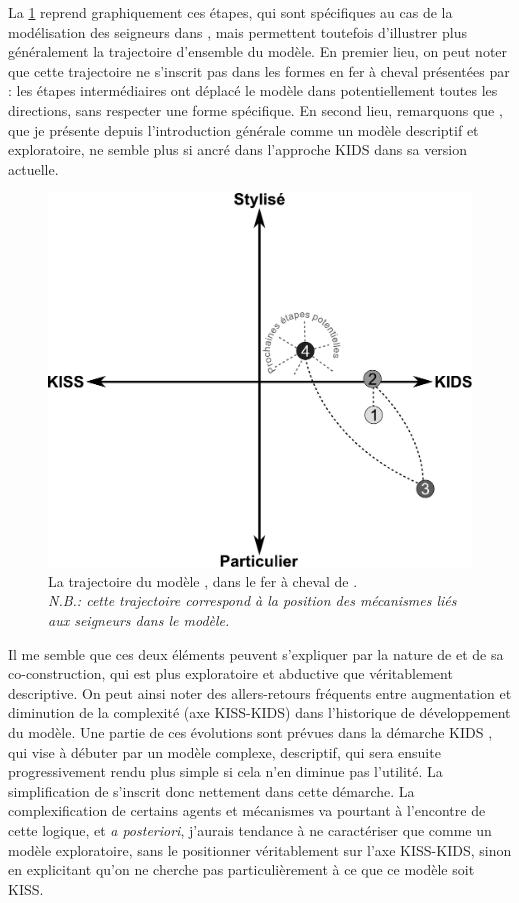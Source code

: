 La \cref{fig:trajectoire-simfeodal} reprend graphiquement ces étapes, qui sont spécifiques au cas de la modélisation des seigneurs dans \simfeodal{}, mais permettent toutefois d'illustrer plus généralement la trajectoire d'ensemble du modèle.
En premier lieu, on peut noter que cette trajectoire ne s'inscrit pas dans les formes \og en fer à cheval\fg{} présentées par \textcite{banos2013modeliser} : les étapes intermédiaires ont \og déplacé\fg{} le modèle dans potentiellement toutes les directions, sans respecter une forme spécifique.
En second lieu, remarquons que \simfeodal{}, que je présente depuis l'introduction générale comme un modèle descriptif et exploratoire, ne semble plus si ancré dans l'approche KIDS dans sa version actuelle.

\begin{figure}[H]
	\centering
	\includegraphics[width=.8\linewidth]{img/trajectoire_simfeodal.pdf}
	\caption[La trajectoire du modèle \simfeodal{}, dans le \og fer à cheval\fg{} de \textcite{banos2013modeliser}.]{La trajectoire du modèle \simfeodal{}, dans le \og fer à cheval\fg{} de \textcite{banos2013modeliser}.\\
	\textit{N.B.: cette trajectoire correspond à la position des mécanismes liés aux seigneurs dans le modèle.}}
	\label{fig:trajectoire-simfeodal}
\end{figure}

Il me semble que ces deux éléments peuvent s'expliquer par la nature de \simfeodal{} et de sa co-construction, qui est plus exploratoire et abductive que véritablement descriptive.
On peut ainsi noter des allers-retours fréquents entre augmentation et diminution de la complexité (axe KISS-KIDS) dans l'historique de développement du modèle.
Une partie de ces évolutions sont prévues dans la démarche KIDS \autocite{edmonds_kiss_2005}, qui vise à débuter par un modèle \og complexe\fg{}, descriptif, qui sera ensuite progressivement rendu plus simple si cela n'en diminue pas l'utilité.
La \og simplification\fg{} de \simfeodal{} s'inscrit donc nettement dans cette démarche.
La complexification de certains agents et mécanismes va pourtant à l'encontre de cette logique, et \textit{a posteriori}, j'aurais tendance à ne caractériser \simfeodal{} que comme un modèle exploratoire, sans le positionner véritablement sur l'axe KISS-KIDS, sinon en explicitant qu'on ne cherche pas particulièrement à ce que ce modèle soit KISS.


